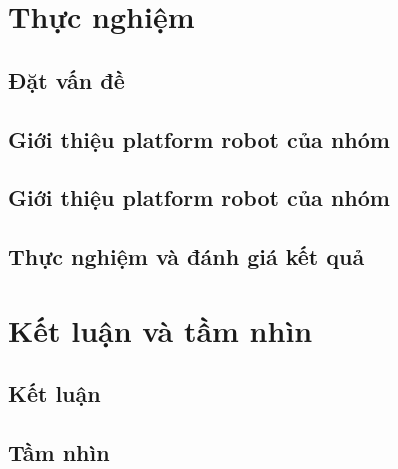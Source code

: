\chapter{Thực nghiệm}

\section{Đặt vấn đề}


\section{Giới thiệu platform robot của nhóm}


\section{Giới thiệu platform robot của nhóm}
\label{sec:RobotIntro}


\section{Thực nghiệm và đánh giá kết quả}
\label{sec:testbed}


\chapter{Kết luận và tầm nhìn}
\label{chap:KetLuan}

\section{Kết luận}


\section{Tầm nhìn}
